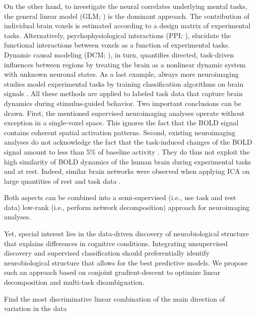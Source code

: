 \documentclass{article} %
\begin{document}
\linebreak

On the other hand, to investigate
the neural correlates underlying mental tasks,
the general linear model (GLM; \cite{friston94}) is the dominant approach.
The contribution of
individual brain voxels is estimated
according to a design matrix of experimental tasks.
Alternatively, psychophysiological interactions (PPI; \cite{friston97}),
elucidate the functional interactions between voxels as a function
of experimental tasks.
Dynamic causal modeling (DCM; \cite{stephan04}), in turn, quantifies directed,
task-driven influences between regions
by treating the brain as a nonlinear dynamic system with unknown
neuronal states. As a last example, always more neuroimaging studies model
experimental tasks by training classification algorithms on brain signals
\cite{poldrack09decoding}.
All these methods are applied to labeled task data that capture brain dynamics
during stimulus-guided behavior.
Two important conclusions can be drawn.
First, the mentioned supervised neuroimaging analyses operate
without exception in a single-voxel space. This ignores the fact that the BOLD
signal contains coherent spatial activation patterns.
Second, existing neuroimaging analyses do not acknowledge the fact that the
task-induced changes of the BOLD signal amount to less than 5\%
of baseline activity \cite{fox07}. They do thus not exploit the high similarity
of BOLD dynamics of the human brain during experimental tasks and at rest.
Indeed, similar brain networks were observed when applying ICA on
large quantities of
rest and task data \cite{smith2009}.

\linebreak

Both aspects can be combined into a 
semi-supervised (i.e., use task and rest data)
low-rank (i.e., perform network decomposition)
approach for neuroimaging analyses.



Yet, special interest lies in the data-driven
discovery of neurobiological structure that explains differences
in cognitive conditions. Integrating unsupervised discovery and
supervised classification should preferentially identify
neurobiological structure that allows for the best predictive models. We
propose such an approach based on conjoint gradient-descent to optimize
linear decomposition and multi-task disambiguation.

Find the most discriminative linear combination of the main direction of
variation in the data
\end{document}
